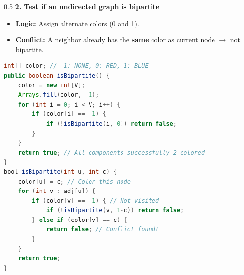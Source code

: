 \documentclass[8pt,aspectratio=169]{beamer}
\begin{document}
\begin{frame}[t, fragile]
\begin{columns}[T]
    \begin{column}{0.5\textwidth}
        \textbf{2. Test if an undirected graph is bipartite}
        \begin{itemize}
            \item \textbf{Logic:} Assign alternate colors (0 and 1).
            \item \textbf{Conflict:} A neighbor already has the \textbf{same} color as current node $\rightarrow$ not bipartite.
        \end{itemize}
\begin{lstlisting}[language=Java, basicstyle=\tiny\ttfamily, keywordstyle=\color{blue}, frame=single]
int[] color; // -1: NONE, 0: RED, 1: BLUE
public boolean isBipartite() {
    color = new int[V];
    Arrays.fill(color, -1);
    for (int i = 0; i < V; i++) {
        if (color[i] == -1) { 
            if (!isBipartite(i, 0)) return false;
        }
    }
    return true; // All components successfully 2-colored
}
bool isBipartite(int u, int c) {
    color[u] = c; // Color this node
    for (int v : adj[u]) {
        if (color[v] == -1) { // Not visited
            if (!isBipartite(v, 1-c)) return false;
        } else if (color[v] == c) {
            return false; // Conflict found!
        }
    }
    return true;
}
        \end{lstlisting}
    \end{column}
\end{columns}
\end{frame}
\end{document}
